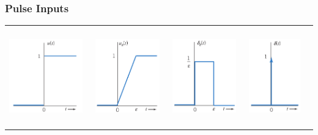 \documentclass[aspectratio=169]{beamer}
\begin{document}
\begin{frame}[fragile]
	\frametitle{Pulse Inputs}
\begin{tabular}{ll}

	\begin{columns}
		\begin{column}{0.25\textwidth}  %
\includegraphics[height=3.5cm]{figure4.png}

		\end{column}
		\begin{column}{0.25\textwidth}  %
\includegraphics[height=3.5cm]{figure5.png}

		\end{column}
		\begin{column}{0.25\textwidth}  %
\includegraphics[height=3.5cm]{figure6.png}

		\end{column}
		\begin{column}{0.25\textwidth}  %
\includegraphics[height=3.5cm]{figure7.png}


\end{column}
\end{columns}
\end{tabular}
\end{frame}
\end{document}
